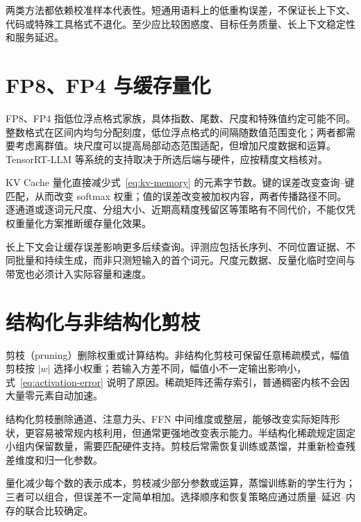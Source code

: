 两类方法都依赖校准样本代表性。短通用语料上的低重构误差，不保证长上下文、代码或特殊工具格式不退化。至少应比较困惑度、目标任务质量、长上下文稳定性和服务延迟。

\section{FP8、FP4 与缓存量化}

FP8、FP4 指低位浮点格式家族，具体指数、尾数、尺度和特殊值约定可能不同。整数格式在区间内均匀分配刻度，低位浮点格式的间隔随数值范围变化；两者都需要考虑离群值。块尺度可以提高局部动态范围适配，但增加尺度数据和运算。TensorRT-LLM 等系统的支持取决于所选后端与硬件，应按精度文档核对\cite{trt}。

KV Cache 量化直接减少式~\eqref{eq:kv-memory} 的元素字节数。键的误差改变查询--键匹配，从而改变 softmax 权重；值的误差改变被加权内容，两者传播路径不同。逐通道或逐词元尺度、分组大小、近期高精度残留区等策略有不同代价，不能仅凭权重量化方案推断缓存量化效果。

长上下文会让缓存误差影响更多后续查询。评测应包括长序列、不同位置证据、不同批量和持续生成，而非只测短输入的首个词元。尺度元数据、反量化临时空间与带宽也必须计入实际容量和速度。

\section{结构化与非结构化剪枝}

剪枝（pruning）删除权重或计算结构。非结构化剪枝可保留任意稀疏模式，幅值剪枝按 $|w|$ 选择小权重；若输入方差不同，幅值小不一定输出影响小，式~\eqref{eq:activation-error} 说明了原因。稀疏矩阵还需存索引，普通稠密内核不会因大量零元素自动加速。

结构化剪枝删除通道、注意力头、FFN 中间维度或整层，能够改变实际矩阵形状，更容易被常规内核利用，但通常更强地改变表示能力。半结构化稀疏规定固定小组内保留数量，需要匹配硬件支持。剪枝后常需恢复训练或蒸馏，并重新检查残差维度和归一化参数。

量化减少每个数的表示成本，剪枝减少部分参数或运算，蒸馏训练新的学生行为；三者可以组合，但误差不一定简单相加。选择顺序和恢复策略应通过质量--延迟--内存的联合比较确定。

